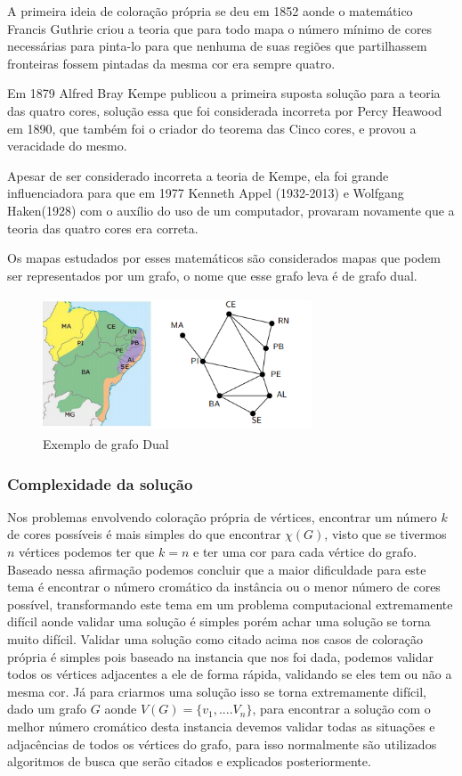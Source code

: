 \documentclass[12pt]{article}
\begin{document}
	A primeira ideia de coloração própria se deu em 1852 aonde o matemático Francis Guthrie criou a teoria que para todo mapa o número mínimo de cores necessárias para pinta-lo para que nenhuma de suas regiões que partilhassem fronteiras fossem pintadas da mesma cor era sempre quatro.
	
	
	Em 1879 Alfred Bray Kempe publicou a primeira suposta solução para a teoria das quatro cores, solução essa que foi considerada incorreta por Percy Heawood em 1890, que também foi o criador do teorema das Cinco cores, e provou a veracidade do mesmo.
	
	Apesar de ser considerado incorreta a teoria de Kempe, ela foi grande influenciadora para que em 1977 Kenneth Appel (1932-2013) e Wolfgang Haken(1928) com o auxílio do uso de um computador, provaram novamente que a teoria das quatro cores era correta.
	
	Os mapas estudados por esses matemáticos são considerados mapas que podem ser representados por um grafo, o nome que esse grafo leva é de grafo dual. 
	
	\begin{figure}[!htb]
		\centering
		 \includegraphics[width=8cm,height=4cm]{grafoDual}
		\caption{Exemplo de grafo Dual}    
	\end{figure}

	
	\subsubsection{Complexidade da solução}
	
	Nos problemas envolvendo coloração própria de vértices, encontrar um número $k$ de cores possíveis é mais simples do que encontrar $\chi(G)$, visto que se tivermos $n$ vértices podemos ter que $k = n$ e ter uma cor para cada vértice do grafo. Baseado nessa afirmação podemos concluir que a maior dificuldade para este tema é encontrar o número cromático da instância ou o menor número de cores possível, transformando este tema em um problema computacional extremamente difícil aonde validar uma solução é simples porém achar uma solução se torna muito difícil.
	Validar uma solução como citado acima nos casos de coloração própria é simples pois baseado na instancia que nos foi dada, podemos validar todos os vértices adjacentes a ele de forma rápida, validando se eles tem ou não a mesma cor. Já para criarmos uma solução isso se torna extremamente difícil, dado um grafo $G$ aonde $V(G) = \{v_{1}, .... V_{n} \}$, para encontrar a solução com o melhor número cromático desta instancia devemos validar todas as situações e adjacências de todos os vértices do grafo, para isso normalmente são utilizados algoritmos de busca que serão citados e explicados posteriormente.
	
\end{document}
